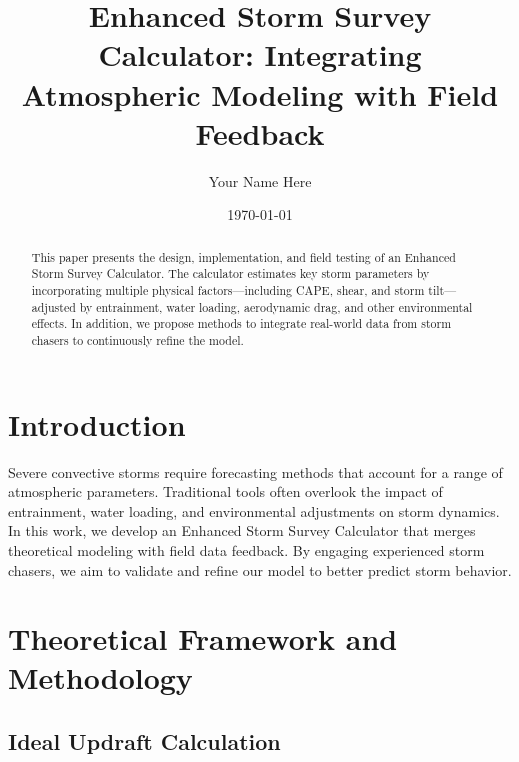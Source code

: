 \documentclass[12pt]{article}
\title{Enhanced Storm Survey Calculator: Integrating Atmospheric Modeling with Field Feedback}
\author{Your Name Here}
\date{\today}
\begin{document}
\maketitle

\begin{abstract}
This paper presents the design, implementation, and field testing of an Enhanced Storm Survey Calculator. The calculator estimates key storm parameters by incorporating multiple physical factors—including CAPE, shear, and storm tilt—adjusted by entrainment, water loading, aerodynamic drag, and other environmental effects. In addition, we propose methods to integrate real-world data from storm chasers to continuously refine the model.
\end{abstract}

\section{Introduction}

Severe convective storms require forecasting methods that account for a range of atmospheric parameters. Traditional tools often overlook the impact of entrainment, water loading, and environmental adjustments on storm dynamics. In this work, we develop an Enhanced Storm Survey Calculator that merges theoretical modeling with field data feedback. By engaging experienced storm chasers, we aim to validate and refine our model to better predict storm behavior.

\section{Theoretical Framework and Methodology}

\subsection{Ideal Updraft Calculation}
\end{document}
